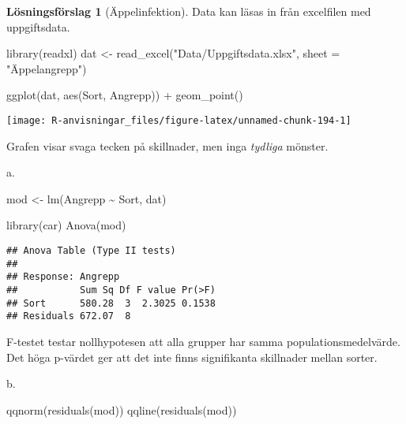 \documentclass[
]{book}
\newenvironment{Shaded}{\begin{snugshade}}{\end{snugshade}}
\newcommand{\AttributeTok}[1]{\textcolor[rgb]{0.77,0.63,0.00}{#1}}
\newcommand{\FunctionTok}[1]{\textcolor[rgb]{0.00,0.00,0.00}{#1}}
\newcommand{\NormalTok}[1]{#1}
\newcommand{\OtherTok}[1]{\textcolor[rgb]{0.56,0.35,0.01}{#1}}
\newcommand{\SpecialCharTok}[1]{\textcolor[rgb]{0.00,0.00,0.00}{#1}}
\newcommand{\StringTok}[1]{\textcolor[rgb]{0.31,0.60,0.02}{#1}}
\theoremstyle{definition}
\theoremstyle{definition}
\theoremstyle{definition}
\theoremstyle{definition}
\newtheorem{hypothesis}{Lösningsförslag}[chapter]
\theoremstyle{remark}
\begin{document}
\begin{hypothesis}[Äppelinfektion]
Data kan läsas in från excelfilen med uppgiftsdata.

\begin{Shaded}
\begin{Highlighting}[]
\FunctionTok{library}\NormalTok{(readxl)}
\NormalTok{dat }\OtherTok{\textless{}{-}} \FunctionTok{read\_excel}\NormalTok{(}\StringTok{"Data/Uppgiftsdata.xlsx"}\NormalTok{, }\AttributeTok{sheet =} \StringTok{"Äppelangrepp"}\NormalTok{)}

\FunctionTok{ggplot}\NormalTok{(dat, }\FunctionTok{aes}\NormalTok{(Sort, Angrepp)) }\SpecialCharTok{+}
  \FunctionTok{geom\_point}\NormalTok{()}
\end{Highlighting}
\end{Shaded}

\begin{center}\texttt{[image: R-anvisningar\_files/figure-latex/unnamed-chunk-194-1]} \end{center}

Grafen visar svaga tecken på skillnader, men inga \emph{tydliga} mönster.

a.

\begin{Shaded}
\begin{Highlighting}[]
\NormalTok{mod }\OtherTok{\textless{}{-}} \FunctionTok{lm}\NormalTok{(Angrepp }\SpecialCharTok{\textasciitilde{}}\NormalTok{ Sort, dat)}

\FunctionTok{library}\NormalTok{(car)}
\FunctionTok{Anova}\NormalTok{(mod)}
\end{Highlighting}
\end{Shaded}

\begin{verbatim}
## Anova Table (Type II tests)
## 
## Response: Angrepp
##           Sum Sq Df F value Pr(>F)
## Sort      580.28  3  2.3025 0.1538
## Residuals 672.07  8
\end{verbatim}

F-testet testar nollhypotesen att alla grupper har samma populationsmedelvärde. Det höga p-värdet ger att det inte finns signifikanta skillnader mellan sorter.

b.

\begin{Shaded}
\begin{Highlighting}[]
\FunctionTok{qqnorm}\NormalTok{(}\FunctionTok{residuals}\NormalTok{(mod))}
\FunctionTok{qqline}\NormalTok{(}\FunctionTok{residuals}\NormalTok{(mod))}
\end{Highlighting}
\end{Shaded}


\end{hypothesis}
\end{document}
